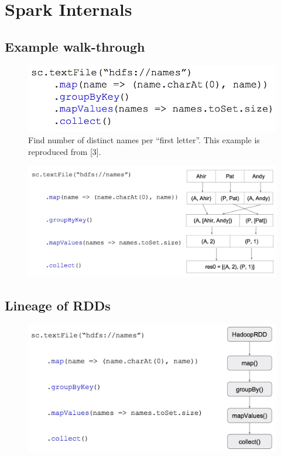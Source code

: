 \section{Spark Internals}

\subsection{Example walk-through}
\begin{frame}
\begin{figure}
\centering
\includegraphics[width=0.8\linewidth]{figures/example2.jpg}
\caption{Find number of distinct names per ``first letter''. This example is
reproduced from [3].}
\end{figure}
\end{frame}

\begin{frame}
\begin{figure}
\centering
\includegraphics[width=0.9\linewidth]{figures/example2-wall-through.jpg}
\end{figure}
\end{frame}

\subsection{Lineage of RDDs}
\begin{frame}
\begin{figure}
\centering
\includegraphics[width=0.9\linewidth]{figures/example2-rdd-dag.jpg}
\end{figure}
\end{frame}

